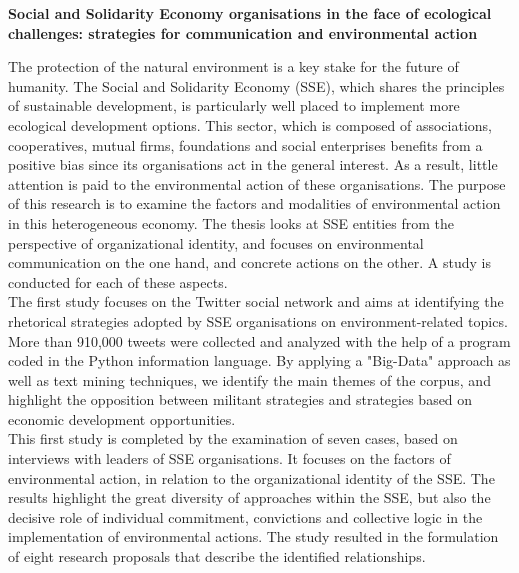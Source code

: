 \begin{center}
  \large \textbf{Social and Solidarity Economy organisations in the face of ecological challenges: strategies for communication and environmental action}
\end{center}

\vspace{1cm}

The protection of the natural environment is a key stake for the future of humanity.  The Social and Solidarity Economy (SSE), which shares the principles of sustainable development, is particularly well placed to implement more ecological development options. This sector, which is composed of associations, cooperatives, mutual firms, foundations and social enterprises benefits from a positive bias since its organisations act in the general interest. As a result, little attention is paid to the environmental action of these organisations.
The purpose of this research is to examine the factors and modalities of environmental action in this heterogeneous economy. The thesis looks at SSE entities from the perspective of organizational identity, and focuses on environmental communication on the one hand, and concrete actions on the other. A study is conducted for each of these aspects.\\

The first study focuses on the Twitter social network and aims at identifying the rhetorical strategies adopted by SSE organisations on environment-related topics. More than 910,000 tweets were collected and analyzed with the help of a program coded in the Python information language. By applying a "Big-Data" approach as well as text mining techniques, we identify the main themes of the corpus, and highlight the opposition between militant strategies and strategies based on economic development opportunities. \\

This first study is completed by the examination of seven cases, based on interviews with leaders of SSE organisations. It focuses on the factors of environmental action, in relation to the organizational identity of the SSE. The results highlight the great diversity of approaches within the SSE, but also the decisive role of individual commitment, convictions and collective logic in the implementation of environmental actions. The study resulted in the formulation of eight research proposals that describe the identified relationships.  \\

